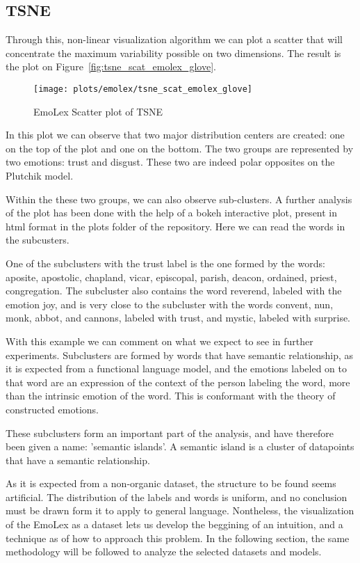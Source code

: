 \subsection{TSNE}
Through this, non-linear visualization algorithm we can plot a scatter that will concentrate the maximum variability possible on two dimensions. The result is the plot on Figure~\ref{fig:tsne_scat_emolex_glove}.

\begin{figure}[H]
  \texttt{[image: plots/emolex/tsne\_scat\_emolex\_glove]}
  \centering
  \caption{EmoLex Scatter plot of TSNE}
\end{figure}\label{fig:tsne_scat_emolex_glove}

In this plot we can observe that two major distribution centers are created: one on the top of the plot and one on the bottom. The two groups are represented by two emotions: trust and disgust. These two are indeed polar opposites on the Plutchik model.

Within the these two groups, we can also observe sub-clusters. A further analysis of the plot has been done with the help of a bokeh interactive plot, present in html format in the plots folder of the repository. Here we can read the words in the subcusters.

One of the subclusters with the trust label is the one formed by the words: aposite, apostolic, chapland, vicar, episcopal, parish, deacon, ordained, priest, congregation. The subcluster also contains the word reverend, labeled with the emotion joy, and is very close to the subcluster with the words convent, nun, monk, abbot, and cannons, labeled with trust, and mystic, labeled with surprise.

With this example we can comment on what we expect to see in further experiments. Subclusters are formed by words that have semantic relationship, as it is expected from a functional language model, and the emotions labeled on to that word are an expression of the context of the person labeling the word, more than the intrinsic emotion of the word. This is conformant with the theory of constructed emotions.

These subclusters form an important part of the analysis, and have therefore been given a name: 'semantic islands'. A semantic island is a cluster of datapoints that have a semantic relationship.

As it is expected from a non-organic dataset, the structure to be found seems artificial. The distribution of the labels and words is uniform, and no conclusion must be drawn form it to apply to general language. Nontheless, the visualization of the EmoLex as a dataset lets us develop the beggining of an intuition, and a technique as of how to approach this problem. In the following section, the same methodology will be followed to analyze the selected datasets and models.



